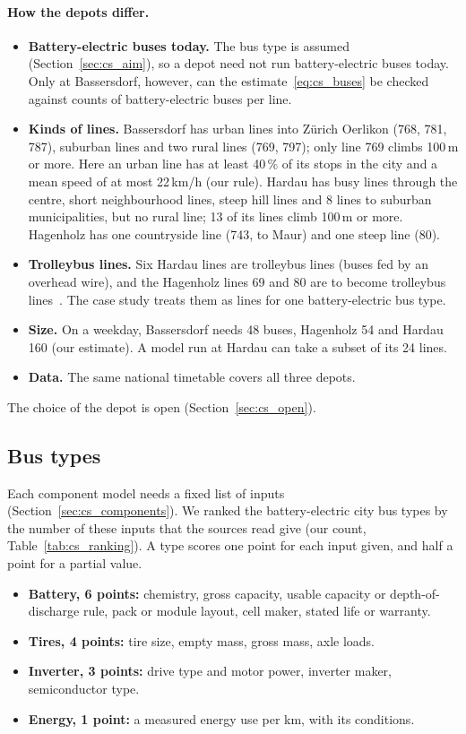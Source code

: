 \documentclass[11pt,a4paper]{article}
\theoremstyle{plain}
\theoremstyle{definition}
\theoremstyle{remark}
\begin{document}
\paragraph{How the depots differ.}
\begin{itemize}
  \item \textbf{Battery-electric buses today.} The bus type is assumed (Section~\ref{sec:cs_aim}), so a depot need not run battery-electric buses today.
    Only at Bassersdorf, however, can the estimate~\eqref{eq:cs_buses} be checked against counts of battery-electric buses per line.
  \item \textbf{Kinds of lines.} Bassersdorf has urban lines into Z\"urich Oerlikon (768, 781, 787), suburban lines and two rural lines (769, 797); only line 769 climbs 100\,m or more.
    Here an urban line has at least 40\,\% of its stops in the city and a mean speed of at most 22\,km/h (our rule).
    Hardau has busy lines through the centre, short neighbourhood lines, steep hill lines and 8 lines to suburban municipalities, but no rural line; 13 of its lines climb 100\,m or more.
    Hagenholz has one countryside line (743, to Maur) and one steep line (80).
  \item \textbf{Trolleybus lines.} Six Hardau lines are trolleybus lines (buses fed by an overhead wire), and the Hagenholz lines 69 and 80 are to become trolleybus lines~\cite{VBZ2026Depots}.
    The case study treats them as lines for one battery-electric bus type.
  \item \textbf{Size.} On a weekday, Bassersdorf needs 48 buses, Hagenholz 54 and Hardau 160 (our estimate).
    A model run at Hardau can take a subset of its 24 lines.
  \item \textbf{Data.} The same national timetable covers all three depots.
\end{itemize}
The choice of the depot is open (Section~\ref{sec:cs_open}).

\subsection{Bus types}\label{sec:cs_buses}

Each component model needs a fixed list of inputs (Section~\ref{sec:cs_components}).
We ranked the battery-electric city bus types by the number of these inputs that the sources read give (our count, Table~\ref{tab:cs_ranking}).
A type scores one point for each input given, and half a point for a partial value.
\begin{itemize}
  \item \textbf{Battery, 6 points:} chemistry, gross capacity, usable capacity or depth-of-discharge rule, pack or module layout, cell maker, stated life or warranty.
  \item \textbf{Tires, 4 points:} tire size, empty mass, gross mass, axle loads.
  \item \textbf{Inverter, 3 points:} drive type and motor power, inverter maker, semiconductor type.
  \item \textbf{Energy, 1 point:} a measured energy use per km, with its conditions.
\end{itemize}
\end{document}

